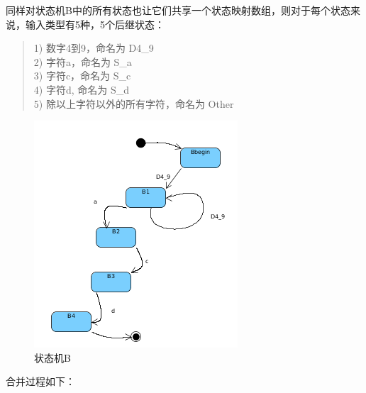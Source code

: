 同样对状态机B中的所有状态也让它们共享一个状态映射数组，则对于每个状态来说，输入类型有5种，5个后继状态：
\begin{quote}
1) 数字4到9，命名为 D4\_9 \\
2) 字符a，命名为 S\_a \\
3) 字符c，命名为 S\_c \\
4) 字符d, 命名为 S\_d \\
5) 除以上字符以外的所有字符，命名为 Other
\end{quote}
\begin{figure}
 \centering
 \includegraphics[scale=1]{s_b.png}
 \caption{状态机B}
 \label{fig:state_b}
\end{figure}
合并过程如下：
